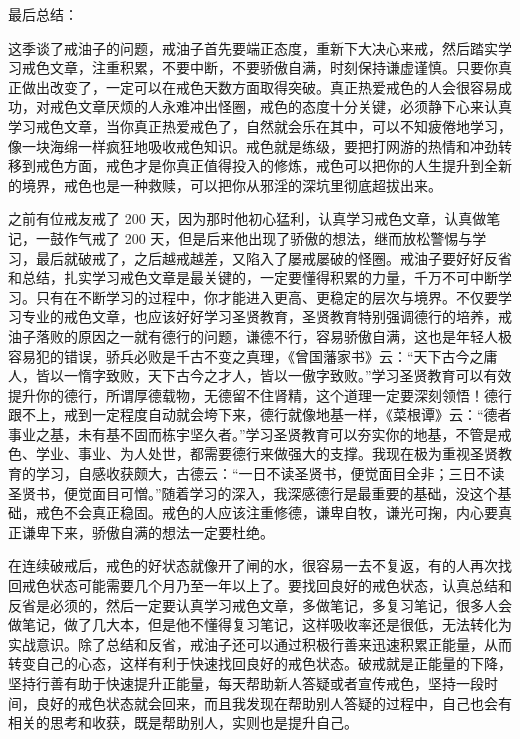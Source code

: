 最后总结：

这季谈了戒油子的问题，戒油子首先要端正态度，重新下大决心来戒，然后踏实学习戒色文章，注重积累，不要中断，不要骄傲自满，时刻保持谦虚谨慎。只要你真正做出改变了，一定可以在戒色天数方面取得突破。真正热爱戒色的人会很容易成功，对戒色文章厌烦的人永难冲出怪圈，戒色的态度十分关键，必须静下心来认真学习戒色文章，当你真正热爱戒色了，自然就会乐在其中，可以不知疲倦地学习，像一块海绵一样疯狂地吸收戒色知识。戒色就是练级，要把打网游的热情和冲劲转移到戒色方面，戒色才是你真正值得投入的修炼，戒色可以把你的人生提升到全新的境界，戒色也是一种救赎，可以把你从邪淫的深坑里彻底超拔出来。

之前有位戒友戒了 200 天，因为那时他初心猛利，认真学习戒色文章，认真做笔记，一鼓作气戒了 200 天，但是后来他出现了骄傲的想法，继而放松警惕与学习，最后就破戒了，之后越戒越差，又陷入了屡戒屡破的怪圈。戒油子要好好反省和总结，扎实学习戒色文章是最关键的，一定要懂得积累的力量，千万不可中断学习。只有在不断学习的过程中，你才能进入更高、更稳定的层次与境界。不仅要学习专业的戒色文章，也应该好好学习圣贤教育，圣贤教育特别强调德行的培养，戒油子落败的原因之一就有德行的问题，谦德不行，容易骄傲自满，这也是年轻人极容易犯的错误，骄兵必败是千古不变之真理，《曾国藩家书》云：“天下古今之庸人，皆以一惰字致败，天下古今之才人，皆以一傲字致败。”学习圣贤教育可以有效提升你的德行，所谓厚德载物，无德留不住肾精，这个道理一定要深刻领悟！德行跟不上，戒到一定程度自动就会垮下来，德行就像地基一样，《菜根谭》云：“德者事业之基，未有基不固而栋宇坚久者。”学习圣贤教育可以夯实你的地基，不管是戒色、学业、事业、为人处世，都需要德行来做强大的支撑。我现在极为重视圣贤教育的学习，自感收获颇大，古德云：“一日不读圣贤书，便觉面目全非；三日不读圣贤书，便觉面目可憎。”随着学习的深入，我深感德行是最重要的基础，没这个基础，戒色不会真正稳固。戒色的人应该注重修德，谦卑自牧，谦光可掬，内心要真正谦卑下来，骄傲自满的想法一定要杜绝。

在连续破戒后，戒色的好状态就像开了闸的水，很容易一去不复返，有的人再次找回戒色状态可能需要几个月乃至一年以上了。要找回良好的戒色状态，认真总结和反省是必须的，然后一定要认真学习戒色文章，多做笔记，多复习笔记，很多人会做笔记，做了几大本，但是他不懂得复习笔记，这样吸收率还是很低，无法转化为实战意识。除了总结和反省，戒油子还可以通过积极行善来迅速积累正能量，从而转变自己的心态，这样有利于快速找回良好的戒色状态。破戒就是正能量的下降，坚持行善有助于快速提升正能量，每天帮助新人答疑或者宣传戒色，坚持一段时间，良好的戒色状态就会回来，而且我发现在帮助别人答疑的过程中，自己也会有相关的思考和收获，既是帮助别人，实则也是提升自己。

